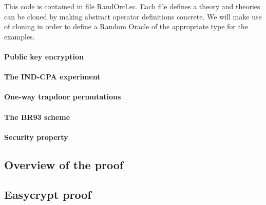 This code is contained in file RandOrcl.ec. Each file defines a theory
and theories can be cloned by making abstract operator definitions
concrete. We will make use of cloning in order to define a Random
Oracle of the appropriate type for the examples.



\paragraph{Public key encryption}
\paragraph{The \textsf{IND-CPA} experiment}
\paragraph{One-way trapdoor permutations}
\paragraph{The BR93 scheme}
\paragraph{Security property}
\subsection{Overview of the proof}

\subsection{Easycrypt proof}


